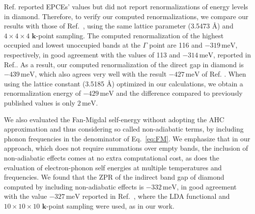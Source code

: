 \documentclass[journal=jctcce,manuscript=article]{achemso}
\newcommand{\bfk}{{\mathbf{k}}}
\begin{document}
Ref.  reported EPCEs' values but did not report renormalizations of energy levels in diamond. Therefore, to verify our computed renormalizations, we compare our results with those of Ref.~, using the same lattice parameter (3.5473 \AA) and $4\times 4\times 4$ $\bfk$-point sampling.  The computed renormalization of the highest occupied  and lowest unoccupied bands at the $\Gamma$ point are 116 and $-319\,\mathrm{meV}$, respectively,  in good agreement with the values of 113 and $-314\,\mathrm{meV}$, reported in Ref.. As a result, our computed renormalization of the direct gap in diamond is $-439\,\mathrm{meV}$, which also agrees very well with the result $-427\,\mathrm{meV}$ of  Ref. . When using the lattice constant (3.5185 \AA) optimized in our calculations, we obtain a renormalization energy  of $-429\,\mathrm{meV}$ and the difference compared to previously published values  is only $2\,\mathrm{meV}$.

We also evaluated the Fan-Migdal self-energy without adopting the AHC approximation and thus considering so called non-adiabatic terms, by including phonon frequencies in the denominator of Eq.~\ref{eq:FM}. We emphasize that in our approach, which  does not require summations over empty bands, the inclusion of non-adiabatic effects comes at no extra computational cost, as does  the evaluation of electron-phonon self energies at multiple temperatures and frequencies. We found that the  ZPR of the indirect band gap of diamond computed by including non-adiabatic effects is $-332\,\mathrm{meV}$, in good agreement with the value $-327\,\mathrm{meV}$ reported in Ref.~, where the LDA functional and $10\times10\times10$ $\bfk$-point sampling were used, as in our work.
\end{document}
